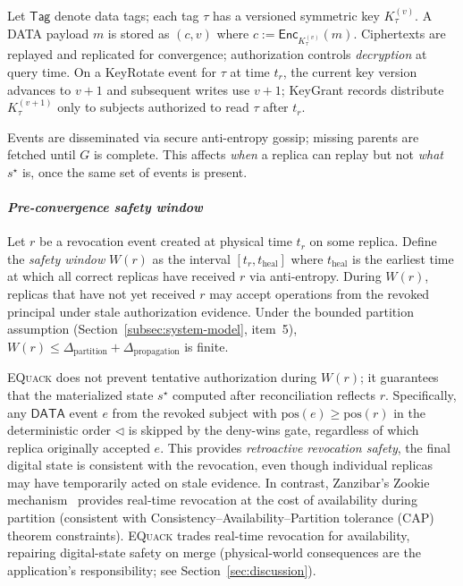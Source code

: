 \documentclass[10pt,journal,compsoc]{IEEEtran}
\newcommand{\equack}{\textsc{EQuack}}
\begin{document}
Let $\mathsf{Tag}$ denote data tags; each tag $\tau$ has a versioned symmetric key $K_{\tau}^{(v)}$. A DATA payload $m$ is stored as $(c,v)$ where $c := \mathsf{Enc}_{K_{\tau}^{(v)}}(m)$. Ciphertexts are replayed and replicated for convergence; authorization controls \emph{decryption} at query time. On a KeyRotate event for $\tau$ at time $t_r$, the current key version advances to $v{+}1$ and subsequent writes use $v{+}1$; KeyGrant records distribute $K_{\tau}^{(v+1)}$ only to subjects authorized to read $\tau$ after $t_r$.

Events are disseminated via secure anti-entropy gossip; missing parents are fetched until $G$ is complete.
This affects \emph{when} a replica can replay but not \emph{what} $s^\star$ is, once the same set of events is present.

\paragraph*{\textit{Pre-convergence safety window}} Let $r$ be a revocation event created at physical time $t_r$ on some replica. Define the \emph{safety window} $W(r)$ as the interval $[t_r, t_{\text{heal}}]$ where $t_{\text{heal}}$ is the earliest time at which all correct replicas have received $r$ via anti-entropy. During $W(r)$, replicas that have not yet received $r$ may accept operations from the revoked principal under stale authorization evidence. Under the bounded partition assumption (Section~\ref{subsec:system-model}, item~5), $W(r) \leq \Delta_{\text{partition}} + \Delta_{\text{propagation}}$ is finite.

\equack{} does not prevent tentative authorization during $W(r)$; it guarantees that the materialized state $s^\star$ computed after reconciliation reflects $r$. Specifically, any $\mathsf{DATA}$ event $e$ from the revoked subject with $\mathrm{pos}(e) \geq \mathrm{pos}(r)$ in the deterministic order $\triangleleft$ is skipped by the deny-wins gate, regardless of which replica originally accepted $e$. This provides \emph{retroactive revocation safety}, the final digital state is consistent with the revocation, even though individual replicas may have temporarily acted on stale evidence. In contrast, Zanzibar's Zookie mechanism~\cite{zanzibar2019} provides real-time revocation at the cost of availability during partition (consistent with Consistency--Availability--Partition tolerance (CAP) theorem constraints). \equack{} trades real-time revocation for availability, repairing digital-state safety on merge (physical-world consequences are the application's responsibility; see Section~\ref{sec:discussion}).
\end{document}
